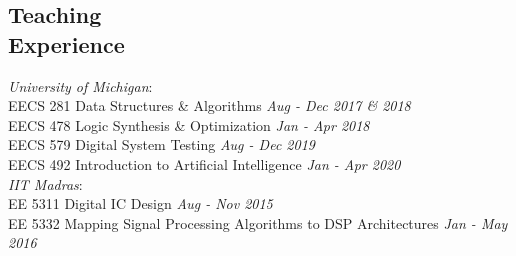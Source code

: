 \documentclass[line,margin,letter]{resume}
\begin{document}
\begin{resume}

\section{\mysidestyle Teaching\\Experience}
    \textit{University of Michigan}: \\
    \phantom{xx}\hspace{3ex} EECS 281 Data Structures \& Algorithms \hfill \emph{Aug - Dec 2017 \& 2018} \\
    \phantom{xx}\hspace{3ex} EECS 478 Logic Synthesis \& Optimization \hfill \emph{Jan - Apr 2018} \\
    \phantom{xx}\hspace{3ex} EECS 579 Digital System Testing \hfill \emph{Aug - Dec 2019} \\
    \phantom{xx}\hspace{3ex} EECS 492 Introduction to Artificial Intelligence \hfill \emph{Jan - Apr 2020} \\
    \textit{IIT Madras}: \\
    \phantom{xx}\hspace{3ex} EE 5311 Digital IC Design \hfill \emph{Aug - Nov 2015} \\
    \phantom{xx}\hspace{3ex} EE 5332 Mapping Signal Processing Algorithms to DSP Architectures \hfill \emph{Jan - May 2016}

    

\end{resume}
\end{document}
